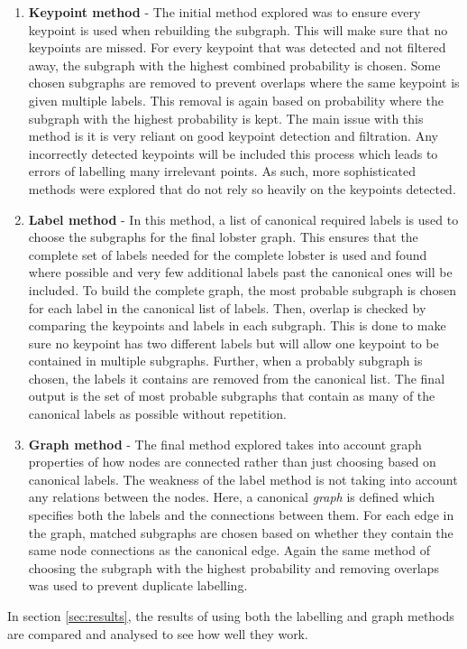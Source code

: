 \begin{enumerate}
\item \textbf{Keypoint method} - The initial method explored was to ensure every keypoint is used when rebuilding the subgraph. This will make sure that no keypoints are missed. For every keypoint that was detected and not filtered away, the subgraph with the highest combined probability is chosen. Some chosen subgraphs are removed to prevent overlaps where the same keypoint is given multiple labels. This removal is again based on probability where the subgraph with the highest probability is kept. The main issue with this method is it is very reliant on good keypoint detection and filtration. Any incorrectly detected keypoints will be included this process which leads to errors of labelling many irrelevant points. As such, more sophisticated methods were explored that do not rely so heavily on the keypoints detected.
\item \textbf{Label method} - In this method, a list of canonical required labels is used to choose the subgraphs for the final lobster graph. This ensures that the complete set of labels needed for the complete lobster is used and found where possible and very few additional labels past the canonical ones will be included. To build the complete graph, the most probable subgraph is chosen for each label in the canonical list of labels. Then, overlap is checked by comparing the keypoints and labels in each subgraph. This is done to make sure no keypoint has two different labels but will allow one keypoint to be contained in multiple subgraphs. Further, when a probably subgraph is chosen, the labels it contains are removed from the canonical list. The final output is the set of most probable subgraphs that contain as many of the canonical labels as possible without repetition. 
\item \textbf{Graph method} - The final method explored takes into account graph properties of how nodes are connected rather than just choosing based on canonical labels. The weakness of the label method is not taking into account any relations between the nodes. Here, a canonical \textit{graph} is defined which specifies both the labels and the connections between them. For each edge in the graph, matched subgraphs are chosen based on whether they contain the same node connections as the canonical edge. Again the same method of choosing the subgraph with the highest probability and removing overlaps was used to prevent duplicate labelling.
\end{enumerate}
\noindent
In section \ref{sec:results}, the results of using both the labelling and graph methods are compared and analysed to see how well they work.


